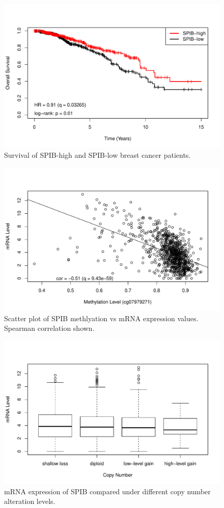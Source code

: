 \begin{figure}[!p]
    \centering
    \includegraphics[scale=0.70]{figures/km_plot.pdf}
    \caption{Survival of SPIB-high and SPIB-low breast cancer patients.}
    \label{km_plot}
\end{figure} 
\clearpage

\clearpage
\begin{figure}[!p]
    \centering
    \includegraphics[scale=0.75]{figures/methylation.pdf}
    \caption{Scatter plot of SPIB methlyation vs mRNA expression values. Spearman correlation shown.}
    \label{methylation}
\end{figure} 
\clearpage
\begin{figure}[!p]
    \centering
    \includegraphics[scale=0.75]{figures/cnv.pdf}
    \caption{mRNA expression of SPIB compared under different copy number alteration levels.}
    \label{cnv}
\end{figure} 
\clearpage

\clearpage